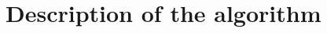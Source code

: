 \documentclass[a4paper, 11pt]{article}
\begin{document}
\tableofcontents
\newpage



\newpage

\section{Description of the algorithm}











\newpage

 

\end{document}
